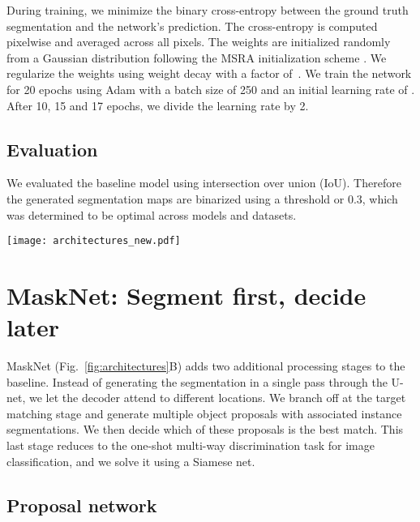 \documentclass{article}
\begin{document}
During training, we minimize the binary cross-entropy between the ground truth segmentation and the network's prediction.
The cross-entropy is computed pixelwise and averaged across all pixels.
The weights are initialized randomly from a Gaussian distribution following the MSRA initialization scheme \cite{He2015b}.
We regularize the weights using  weight decay with a factor of~.
We train the network for 20 epochs using Adam \cite{Kingma2014} with a batch size of 250 and an initial learning rate of .
After 10, 15 and 17 epochs, we divide the learning rate by 2.

\subsection{Evaluation}
\label{sec:baseline/evaluation}

We evaluated the baseline model using intersection over union (IoU).
Therefore the generated segmentation maps are binarized using a threshold or 0.3, which was determined to be optimal across models and datasets.

\begin{figure*}[ht!]
\vskip 0.05in
\begin{center}
\centerline{\texttt{[image: architectures\_new.pdf]}}
\caption{Architectures and details.
\textbf{A,} Siamese U-net baseline (Section~\ref{sec:baseline}).
\textbf{B,} MaskNet (Section~\ref{sec:refined}).
\textbf{C,} Close-up of the individual components, showing architecture details.
}
\label{fig:architectures}
\end{center}
\vskip -0.3in
\end{figure*}

\section{MaskNet: Segment first, decide later}
\label{sec:refined}

MaskNet (Fig.~\ref{fig:architectures}B) adds two additional processing stages to the baseline.
Instead of generating the segmentation in a single pass through the U-net, we let the decoder attend to different locations.
We branch off at the target matching stage and generate multiple object proposals with associated instance segmentations.
We then decide which of these proposals is the best match.
This last stage reduces to the one-shot multi-way discrimination task for image classification, and we solve it using a Siamese net.


\subsection{Proposal network}
\label{sec:refined/proposal}
\end{document}
